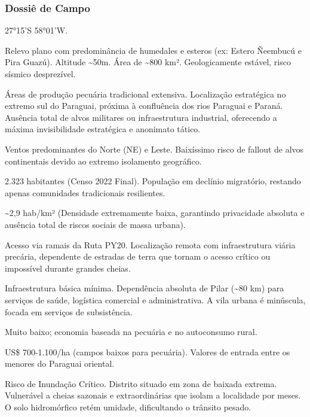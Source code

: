 \subsubsection{Dossiê de Campo}
\begin{description}[style=nextline,leftmargin=0.5cm,font=\bfseries]
\item[Coordenadas]  27°15'S 58°01'W.
\item[Topografia]  Relevo plano com predominância de humedales e esteros (ex: Estero Ñeembucú e Pira Guazú). Altitude \textasciitilde 50m. Área de \textasciitilde 800 km². Geologicamente estável, risco sísmico desprezível.
\item[Alvos Estratégicos]  Áreas de produção pecuária tradicional extensiva. Localização estratégica no extremo sul do Paraguai, próxima à confluência dos rios Paraguai e Paraná. Ausência total de alvos militares ou infraestrutura industrial, oferecendo a máxima invisibilidade estratégica e anonimato tático.
\item[Fallout]  Ventos predominantes do Norte (NE) e Leste. Baixíssimo risco de fallout de alvos continentais devido ao extremo isolamento geográfico.
\item[População]  2.323 habitantes (Censo 2022 Final). População em declínio migratório, restando apenas comunidades tradicionais resilientes.
\item[Densidade]  \textasciitilde 2,9 hab/\allowbreak km² (Densidade extremamente baixa, garantindo privacidade absoluta e ausência total de riscos sociais de massa urbana).
\item[Vias de Acesso]  Acesso via ramais da Ruta PY20. Localização remota com infraestrutura viária precária, dependente de estradas de terra que tornam o acesso crítico ou impossível durante grandes cheias.
\item[Serviços]  Infraestrutura básica mínima. Dependência absoluta de Pilar (\textasciitilde 80 km) para serviços de saúde, logística comercial e administrativa. A vila urbana é minúscula, focada em serviços de subsistência.
\item[Custo de Vida]  Muito baixo; economia baseada na pecuária e no autoconsumo rural.
\item[Preço da Terra]  US\$ 700-1.100/\allowbreak ha (campos baixos para pecuária). Valores de entrada entre os menores do Paraguai oriental.
\item[Hidrologia]  Risco de Inundação Crítico. Distrito situado em zona de baixada extrema. Vulnerável a cheias sazonais e extraordinárias que isolam a localidade por meses. O solo hidromórfico retém umidade, dificultando o trânsito pesado.

\end{description}
